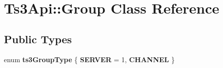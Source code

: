 \hypertarget{class_ts3_api_1_1_group}{}\section{Ts3\+Api\+:\+:Group Class Reference}
\label{class_ts3_api_1_1_group}
\subsection*{Public Types}
\begin{DoxyCompactItemize}
\item 
enum {\bfseries ts3\+Group\+Type} \{ {\bfseries S\+E\+R\+V\+ER} = 1, 
{\bfseries C\+H\+A\+N\+N\+EL}
 \}\hypertarget{class_ts3_api_1_1_group_a7af72d30cc6efe10cbc3986c69393d1f}{}\label{class_ts3_api_1_1_group_a7af72d30cc6efe10cbc3986c69393d1f}

\end{DoxyCompactItemize}
